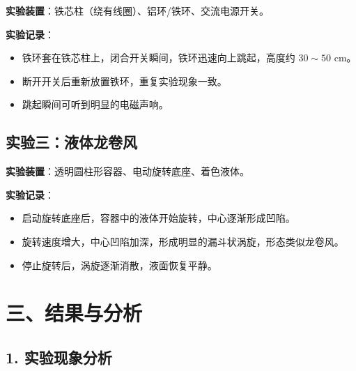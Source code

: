 \documentclass[a4paper,12pt]{article}
\begin{document}
\noindent\textbf{实验装置}：铁芯柱（绕有线圈）、铝环/铁环、交流电源开关。

\noindent\textbf{实验记录}：
\begin{itemize}[nosep]
    \item 铁环套在铁芯柱上，闭合开关瞬间，铁环迅速向上跳起，高度约 $30\sim50$ cm。
    \item 断开开关后重新放置铁环，重复实验现象一致。
    \item 跳起瞬间可听到明显的电磁声响。
\end{itemize}


\vspace{2cm}

\subsection{实验三：液体龙卷风}

\noindent\textbf{实验装置}：透明圆柱形容器、电动旋转底座、着色液体。

\noindent\textbf{实验记录}：
\begin{itemize}[nosep]
    \item 启动旋转底座后，容器中的液体开始旋转，中心逐渐形成凹陷。
    \item 旋转速度增大，中心凹陷加深，形成明显的漏斗状涡旋，形态类似龙卷风。
    \item 停止旋转后，涡旋逐渐消散，液面恢复平静。
\end{itemize}


\newpage

\section{三、结果与分析}

\subsection{1. 实验现象分析}
\end{document}
